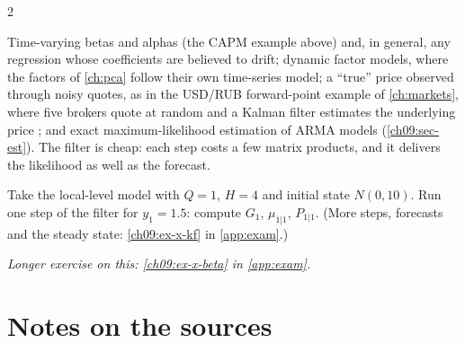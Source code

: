 \begin{paracol}{2}
\begin{finance}
Time-varying betas and alphas (the CAPM example above) and, in general, any regression whose coefficients are believed to drift; dynamic factor models, where the factors of
\cref{ch:pca} follow their own time-series model; a ``true'' price observed through noisy quotes, as in the USD/RUB forward-point example of \cref{ch:markets}, where five
brokers quote at random and a Kalman filter estimates the underlying price ; and exact maximum-likelihood estimation of ARMA models
(\cref{ch09:sec-est}). The filter is cheap: each step costs a few matrix products, and it delivers the likelihood as well as the forecast.
\end{finance}

\begin{exercise}\label{ch09:ex-x-kf-short}
Take the local-level model with $Q=1$, $H=4$ and initial state $N(0,10)$. Run one step of the filter for $y_1=1.5$: compute $G_1$, $\mu_{1|1}$, $P_{1|1}$. (More steps, forecasts and the steady state: \cref{ch09:ex-x-kf} in \cref{app:exam}.)
\end{exercise}

\noindent\emph{Longer exercise on this: \cref{ch09:ex-x-beta} in \cref{app:exam}.}

\section{Notes on the sources}\label{ch09:sec-notes}


\end{paracol}
